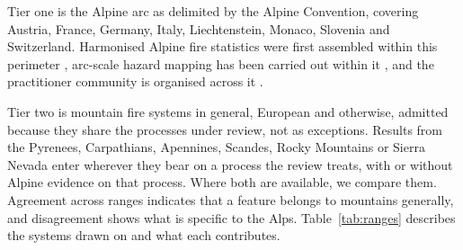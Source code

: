 \documentclass[11pt,a4paper]{article}
\begin{document}
Tier one is the Alpine arc as delimited by the Alpine Convention, covering Austria, France, Germany, Italy, Liechtenstein, Monaco, Slovenia and Switzerland. Harmonised Alpine fire statistics were first assembled within this perimeter \citep{valese_wildfires_2011, muller_forest_2020}, arc-scale hazard mapping has been carried out within it \citep{gerberding_mapping_2025}, and the practitioner community is organised across it \citep{hoang_stakeholders_2026}.

Tier two is mountain fire systems in general, European and otherwise, admitted because they share the processes under review, not as exceptions. Results from the Pyrenees, Carpathians, Apennines, Scandes, Rocky Mountains or Sierra Nevada enter wherever they bear on a process the review treats, with or without Alpine evidence on that process. Where both are available, we compare them. Agreement across ranges indicates that a feature belongs to mountains generally, and disagreement shows what is specific to the Alps. Table~\ref{tab:ranges} describes the systems drawn on and what each contributes.
\end{document}
